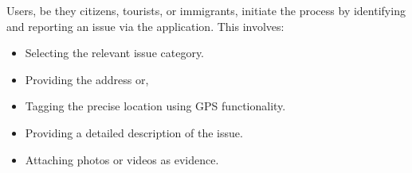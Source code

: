 Users, be they citizens, tourists, or immigrants, initiate the process by identifying and reporting an issue via the application. This involves:
\begin{itemize}
    \item Selecting the relevant issue category.
    \item Providing the address or,
    \item Tagging the precise location using GPS functionality.
    \item Providing a detailed description of the issue.
    \item Attaching photos or videos as evidence.
\end{itemize}